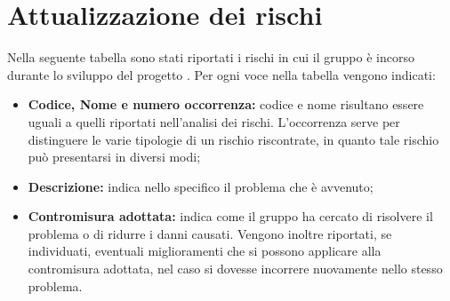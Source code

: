 \section{Attualizzazione dei rischi}

Nella seguente tabella sono stati riportati i rischi in cui il gruppo \Omicron{} è incorso durante lo sviluppo del progetto \nameproject{}.
Per ogni voce nella tabella vengono indicati:
\begin{itemize}
\item \textbf{Codice, Nome e numero occorrenza:} codice e nome risultano essere uguali a quelli riportati nell'analisi dei rischi. L'occorrenza serve per distinguere le varie tipologie di un rischio riscontrate, in quanto tale rischio può presentarsi in diversi modi;
\item \textbf{Descrizione:} indica nello specifico il problema che è avvenuto;
\item \textbf{Contromisura adottata:} indica come il gruppo ha cercato di risolvere il problema o di ridurre i danni causati. Vengono inoltre riportati, se individuati, eventuali miglioramenti che si possono applicare alla contromisura adottata, nel caso si dovesse incorrere nuovamente nello stesso problema.
\end{itemize}

